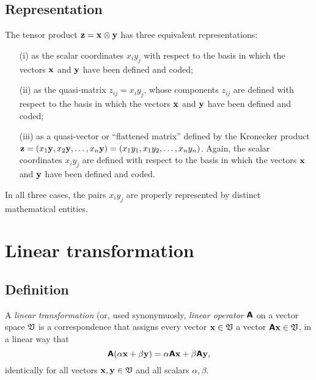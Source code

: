 \subsection{Representation}

The tensor product ${\bf z} = {\bf x} \otimes {\bf y}$     has three equivalent  representations:
\begin{itemize}
\item[(i)]
as the scalar coordinates $x_iy_j$ with respect to the basis in which the vectors ${\bf  x}$ and ${\bf y}$ have been defined and coded;
\item[(ii)]
as the quasi-matrix $z_{ij}  =x_iy_j$, whose components $z_{ij}$ are  defined with respect to the basis in which the vectors ${\bf  x}$ and ${\bf y}$ have been defined and coded;
\item[(iii)]
as a quasi-vector or ``flattened matrix'' defined by the Kronecker product
${\bf z} = ({ x}_1  {\bf y}, { x}_2  {\bf y}, \ldots , { x}_n  {\bf y})=
({ x}_1  { y}_1, { x}_1  { y}_2, \ldots , { x}_n  { y}_n)
$. Again, the scalar coordinates $x_iy_j$ are defined
with respect to the basis in which the vectors ${\bf  x}$ and ${\bf y}$ have been defined and coded.
\end{itemize}
In all three cases, the pairs $x_iy_j$  are properly represented by distinct mathematical entities.


\section{Linear transformation}

\subsection{Definition}
A {\em linear transformation} (or, used synonymuosly, {\em linear operator}
$\textsf{\textbf{A}} $ on a vector space ${\frak V}$ is a correspondence that assigns every vector
${\bf x}\in {\frak V}$ a vector $\textsf{\textbf{A}} {\bf x}\in {\frak V}$,
in a linear way that
\begin{equation}
\textsf{\textbf{A}}  (\alpha {\bf x}+ \beta {\bf y}) = \alpha \textsf{\textbf{A}}{\bf x}
+  \beta \textsf{\textbf{A}} {\bf y},
\end{equation}
identically for all vectors ${\bf x},{\bf y}\in {\frak V}$ and all scalars $\alpha , \beta$.


